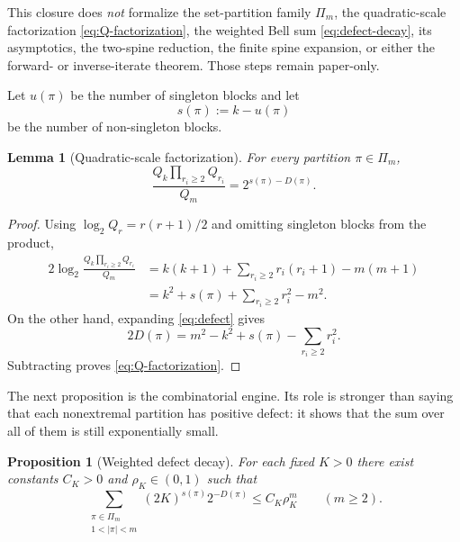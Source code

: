 \documentclass[11pt,oneside]{article}
\newtheorem{proposition}[theorem]{Proposition}
\newtheorem{lemma}[theorem]{Lemma}
\theoremstyle{definition}
\theoremstyle{remark}
\begin{document}
This closure does \emph{not} formalize the set-partition family \(\Pi_m\),
the quadratic-scale factorization \eqref{eq:Q-factorization}, the weighted
Bell sum \eqref{eq:defect-decay}, its asymptotics, the two-spine reduction,
the finite spine expansion, or either the forward- or inverse-iterate theorem.
Those steps remain paper-only.
\endgroup

Let $u(\pi)$ be the number of singleton blocks and let
\begin{equation}
 s(\pi):=k-u(\pi)
 \label{eq:s-nonsingleton}
\end{equation}
be the number of non-singleton blocks.

\begin{lemma}[Quadratic-scale factorization]
\label{lem:Q-factorization}
For every partition $\pi\in\Pi_m$,
\begin{equation}
 \frac{Q_k\prod_{r_i\geq2}Q_{r_i}}{Q_m}
 =2^{s(\pi)-D(\pi)}.
 \label{eq:Q-factorization}
\end{equation}
\end{lemma}

\begin{proof}
Using $\log_2Q_r=r(r+1)/2$ and omitting singleton blocks from the product,
\begin{align*}
 2\log_2\frac{Q_k\prod_{r_i\ge2}Q_{r_i}}{Q_m}
 &=k(k+1)+\sum_{r_i\ge2}r_i(r_i+1)-m(m+1)\\
 &=k^2+s(\pi)+\sum_{r_i\ge2}r_i^2-m^2.
\end{align*}
On the other hand, expanding \eqref{eq:defect} gives
\[
 2D(\pi)=m^2-k^2+s(\pi)-\sum_{r_i\ge2}r_i^2.
\]
Subtracting proves \eqref{eq:Q-factorization}.
\end{proof}

The next proposition is the combinatorial engine.  Its role is stronger than saying
that each nonextremal partition has positive defect: it shows that the sum over all
of them is still exponentially small.

\begin{proposition}[Weighted defect decay]
\label{prop:defect-decay}
For each fixed $K>0$ there exist constants $C_K>0$ and $\rho_K\in(0,1)$ such that
\begin{equation}
 \sum_{\substack{\pi\in\Pi_m\\1<|\pi|<m}}
   (2K)^{s(\pi)}2^{-D(\pi)}
 \leq C_K\rho_K^m
 \qquad(m\geq2).
 \label{eq:defect-decay}
\end{equation}
\end{proposition}
\end{document}
